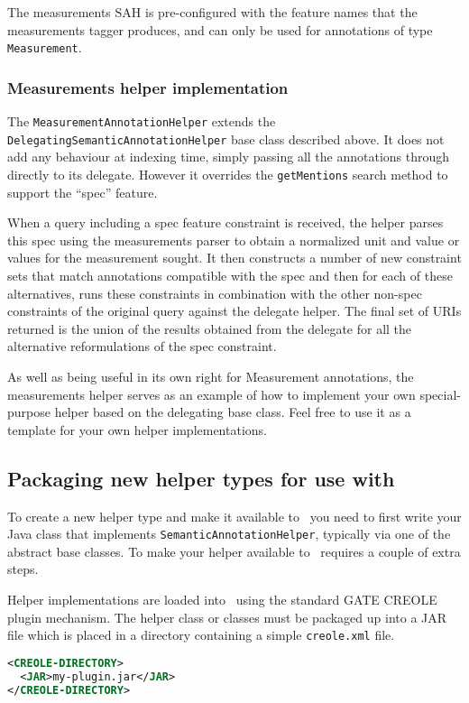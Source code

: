 The measurements SAH is pre-configured with the feature names that the
measurements tagger produces, and can only be used for annotations of type
{\tt Measurement}.

\subsubsection{Measurements helper implementation}

The {\tt MeasurementAnnotationHelper} extends the
{\tt DelegatingSemanticAnnotationHelper} base class described above.  It does
not add any behaviour at indexing time, simply passing all the annotations
through directly to its delegate.  However it overrides the {\tt getMentions}
search method to support the ``spec'' feature.

When a query including a spec feature constraint is received, the helper parses
this spec using the measurements parser to obtain a normalized unit and value
or values for the measurement sought.  It then constructs a number of new
constraint sets that match annotations compatible with the spec and then for
each of these alternatives, runs these constraints in combination with the
other non-spec constraints of the original query against the delegate helper.
The final set of URIs returned is the union of the results obtained from the
delegate for all the alternative reformulations of the spec constraint.

As well as being useful in its own right for Measurement annotations, the
measurements helper serves as an example of how to implement your own
special-purpose helper based on the delegating base class.  Feel free to use it
as a template for your own helper implementations.

\subsection{Packaging new helper types for use with \Mimir}

To create a new helper type and make it available to \Mimir\ you need to first
write your Java class that implements {\tt SemanticAnnotationHelper}, typically
via one of the abstract base classes.  To make your helper available to \Mimir\
requires a couple of extra steps.

Helper implementations are loaded into \Mimir\ using the standard GATE CREOLE
plugin mechanism.  The helper class or classes must be packaged up into a JAR
file which is placed in a directory containing a simple {\tt creole.xml} file.
\begin{lstlisting}[language=XML]
<CREOLE-DIRECTORY>
  <JAR>my-plugin.jar</JAR>
</CREOLE-DIRECTORY>
\end{lstlisting}

